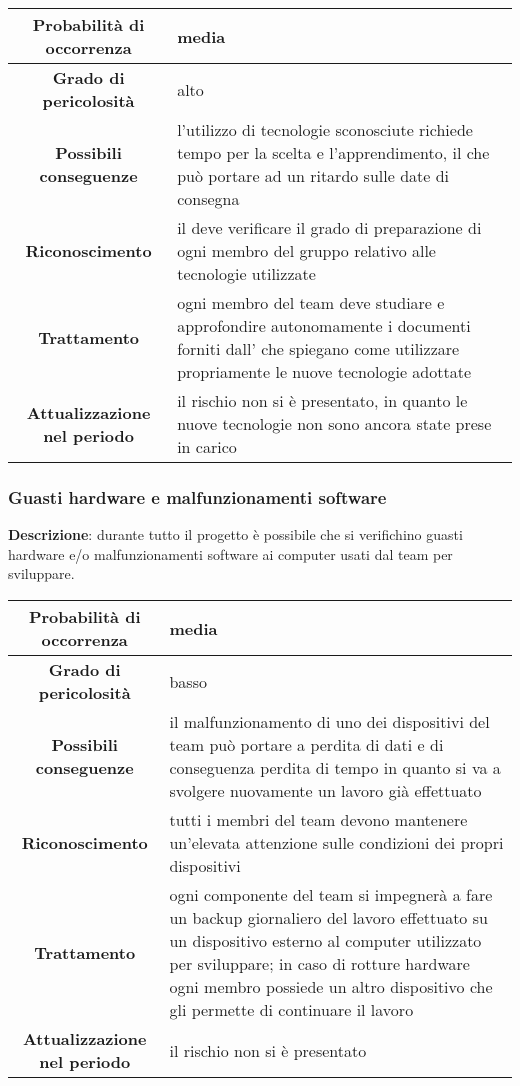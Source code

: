\documentclass[PianoDiProgetto.tex]{subfiles}
\begin{document}
			\begin{center}
				\begin{tabular}{ | c | p{10cm} |}
					\hline
					\textbf{Probabilità di occorrenza} & media  \\ \hline
					\textbf{Grado di pericolosità} & alto \\ \hline
					\textbf{Possibili conseguenze} & l'utilizzo di tecnologie sconosciute richiede tempo per la scelta e l'apprendimento, il che può portare ad un ritardo sulle date di consegna \\ \hline
					\textbf{Riconoscimento} & il \RESP{} deve verificare il grado di preparazione di ogni membro del gruppo relativo alle tecnologie utilizzate \\ \hline
					\textbf{Trattamento} &  ogni membro del team deve studiare e approfondire autonomamente i documenti forniti dall'\AMM{} che spiegano come utilizzare propriamente le nuove tecnologie adottate \\ \hline
					\textbf{Attualizzazione nel periodo} &  il rischio non si è presentato, in quanto le nuove tecnologie non sono ancora state prese in carico \\
					\hline	
				\end{tabular}
		 	\end{center}


	
	\subsubsection{Guasti hardware e malfunzionamenti software}
		\label{sec:ghs}

		 \textbf{Descrizione}: durante tutto il progetto è possibile che si verifichino guasti hardware e/o malfunzionamenti software ai computer usati dal team per sviluppare.
		 
		 \begin{center}
		 	\begin{tabular}{ | c | p{10cm} |}
		 		\hline
		 		\textbf{Probabilità di occorrenza} & media  \\ \hline
		 		\textbf{Grado di pericolosità} & basso \\ \hline
		 		\textbf{Possibili conseguenze} & il malfunzionamento di uno dei dispositivi del team può portare a perdita di dati e di conseguenza perdita di tempo in quanto si va a svolgere nuovamente un lavoro già effettuato \\ \hline
		 		\textbf{Riconoscimento} & tutti i membri del team devono mantenere un'elevata attenzione sulle condizioni dei propri dispositivi \\ \hline
		 		\textbf{Trattamento} & ogni componente del team si impegnerà a fare un backup giornaliero del lavoro effettuato su un dispositivo esterno al computer utilizzato per sviluppare; in caso di rotture hardware ogni membro possiede un altro dispositivo che gli permette di continuare il lavoro \\ \hline
		 		\textbf{Attualizzazione nel periodo} &  il rischio non si è presentato \\
		 		\hline	
		 	\end{tabular}
		 \end{center}	
		
\end{document}
